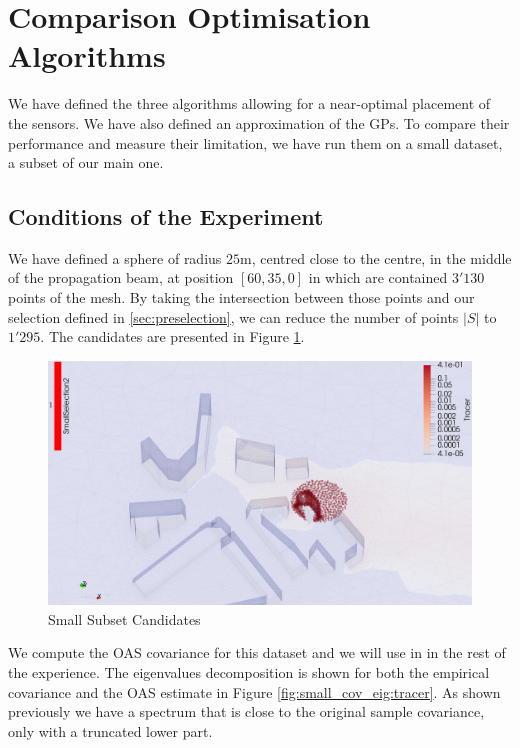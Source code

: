 
\section{Comparison Optimisation Algorithms}

We have defined the three algorithms allowing for a near-optimal placement of the sensors. We have also defined an approximation of the GPs. To compare their performance and measure their limitation, we have run them on a small dataset, a subset of our main one. 
\subsection{Conditions of the Experiment}

We have defined a sphere of radius $25$m, centred close to the centre, in the middle of the propagation beam, at position $[60,35,0]$ in which are contained $3'130$ points of the mesh. By taking the intersection between those points and our selection defined in \ref{sec:preselection}, we can reduce the number of points $|S|$ to $1'295$.  The candidates are presented in Figure      \ref{fig:smallset:position}.
 \\

\begin{figure}[h!]
\centering
    \includegraphics[width=0.8\linewidth]{figures/CompAlg/3rd/non_centered_60.35.0/candidates_screenshot}
    \caption{Small Subset Candidates}
    \label{fig:smallset:position}
\end{figure}

We compute the OAS covariance for this dataset and we will use in in the rest of the experience. The eigenvalues decomposition is shown for both the empirical covariance and the OAS estimate in Figure \ref{fig:small_cov_eig:tracer}. As shown previously we have a spectrum that is close to the original sample covariance,  only with a truncated lower part. \\

